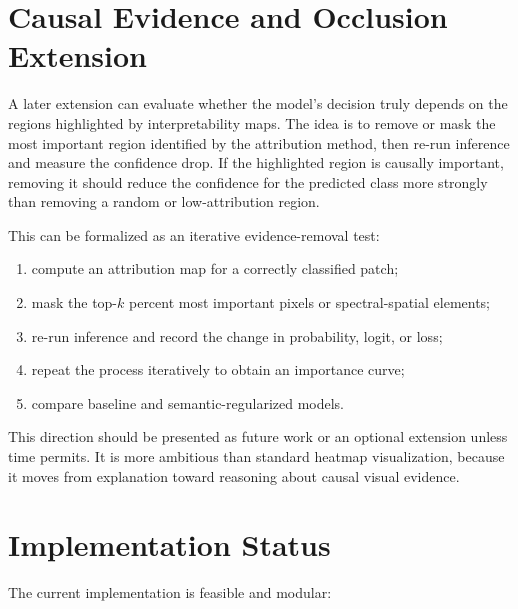\documentclass[10pt,journal,compsoc]{IEEEtran}
\begin{document}
\section{Causal Evidence and Occlusion Extension}

A later extension can evaluate whether the model's decision truly depends on the regions highlighted by interpretability maps. The idea is to remove or mask the most important region identified by the attribution method, then re-run inference and measure the confidence drop. If the highlighted region is causally important, removing it should reduce the confidence for the predicted class more strongly than removing a random or low-attribution region.

This can be formalized as an iterative evidence-removal test:

\begin{enumerate}
    \item compute an attribution map for a correctly classified patch;
    \item mask the top-$k$ percent most important pixels or spectral-spatial elements;
    \item re-run inference and record the change in probability, logit, or loss;
    \item repeat the process iteratively to obtain an importance curve;
    \item compare baseline and semantic-regularized models.
\end{enumerate}

This direction should be presented as future work or an optional extension unless time permits. It is more ambitious than standard heatmap visualization, because it moves from explanation toward reasoning about causal visual evidence.

\section{Implementation Status}

The current implementation is feasible and modular:
\end{document}
